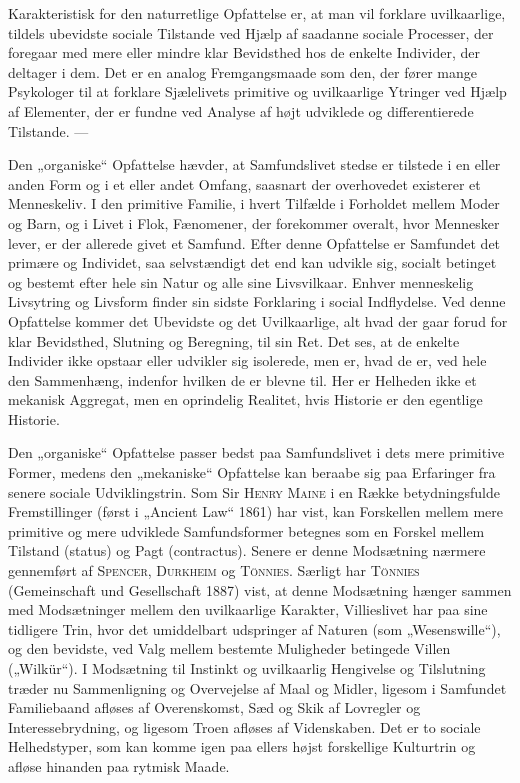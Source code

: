 \documentclass[12pt]{article}
\newcommand{\opage}[1]{\marginnote{\footnotesize\textit{[#1]}}}
\begin{document}
Karakteristisk for den naturretlige Opfattelse er, at man vil forklare
uvilkaarlige, tildels ubevidste sociale Tilstande ved Hjælp af saadanne sociale
Processer, der foregaar med mere eller mindre klar Bevidsthed hos de enkelte
Individer, der deltager i dem. Det er en analog Fremgangsmaade som den, der fører
mange Psykologer
\opage{61}til at forklare Sjælelivets primitive og uvilkaarlige Ytringer ved Hjælp af
Elementer, der er fundne ved Analyse af højt udviklede og differentierede
Tilstande. ---

Den „organiske“ Opfattelse hævder, at Samfundslivet stedse er tilstede i en
eller anden Form og i et eller andet Omfang, saasnart der overhovedet existerer et
Menneskeliv. I den primitive Familie, i hvert Tilfælde i Forholdet mellem Moder
og Barn, og i Livet i Flok, Fænomener, der forekommer overalt, hvor Mennesker
lever, er der allerede givet et Samfund. Efter denne Opfattelse er Samfundet det
primære og Individet, saa selvstændigt det end kan udvikle sig, socialt betinget og
bestemt efter hele sin Natur og alle sine Livsvilkaar. Enhver menneskelig
Livsytring og Livsform finder sin sidste Forklaring i social Indflydelse. Ved denne
Opfattelse kommer det Ubevidste og det Uvilkaarlige, alt hvad der gaar forud for
klar Bevidsthed, Slutning og Beregning, til sin Ret. Det ses, at de enkelte
Individer ikke opstaar eller udvikler sig isolerede, men er, hvad de er, ved hele
den Sammenhæng, indenfor hvilken de er blevne til. Her er Helheden ikke et
mekanisk Aggregat, men en oprindelig Realitet, hvis Historie er den egentlige
Historie.

Den „organiske“ Opfattelse passer bedst paa Samfundslivet i dets mere primitive
Former, medens den „mekaniske“ Opfattelse kan beraabe sig paa Erfaringer fra
senere sociale Udviklingstrin. Som Sir \textsc{Henry Maine} i en Række
betydningsfulde Fremstillinger (først i „Ancient Law“ 1861) har vist, kan
Forskellen mellem mere primitive og mere udviklede Samfundsformer betegnes som en
Forskel mellem Tilstand (status) og Pagt (contractus). Senere er denne Modsætning
nærmere gennemført af \textsc{Spencer}, \textsc{Durkheim} og \textsc{Tönnies}.
Særligt har \textsc{Tönnies} (Gemeinschaft und Gesellschaft 1887) vist, at denne
Modsætning hænger sammen med Modsætninger mellem den uvilkaarlige Karakter,
Villieslivet har paa sine tidligere Trin, hvor det umiddelbart udspringer af
Naturen (som „Wesenswille“), og den bevidste, ved Valg mellem bestemte Muligheder
betingede Villen („Wilkür“). I Modsætning til Instinkt og uvilkaarlig Hengivelse
og Tilslutning træder nu Sammenligning og Overvejelse af Maal og Midler, ligesom i
Samfundet Familiebaand afløses af Overenskomst, Sæd og Skik af Lovregler og
Interessebrydning, og ligesom Troen afløses af Videnskaben. Det er to sociale
Helhedstyper, som kan komme igen paa ellers højst forskellige Kulturtrin og afløse
hinanden paa rytmisk Maade.
\end{document}
